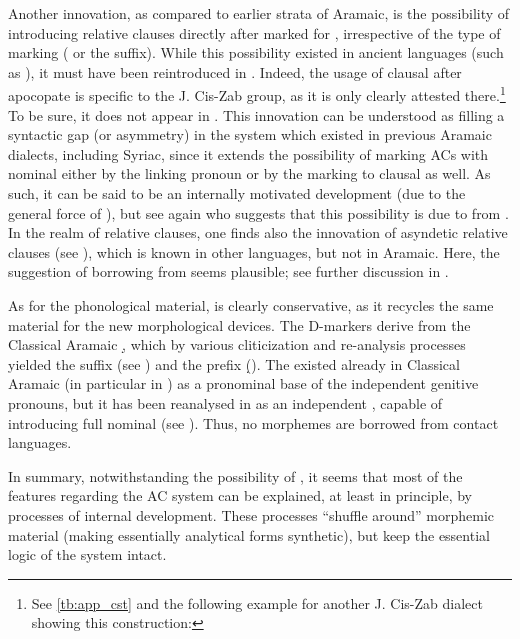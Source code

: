 Another innovation, as compared to earlier strata of Aramaic, is the possibility of introducing relative clauses directly after \prims marked for \cst*, irrespective of the type of marking ( or the \ed suffix). While this possibility existed in ancient  languages (such as \BHeb), it must have been reintroduced in . Indeed, the usage of clausal \secns after apocopate \cst* \prims is specific to the J. Cis-Zab group, as it is only clearly attested there.\footnote{See \vref{tb:app_cst} and the following \Amd example for another J. Cis-Zab dialect showing this construction: 

} To be sure, it does not appear in . This innovation can be understood as filling a syntactic   gap (or asymmetry) in the system which existed in previous Aramaic dialects, including Syriac, since it extends the possibility of marking ACs with nominal \secns either by the linking pronoun or by the \cst* marking to clausal \secns as well. As such, it can be said to be an internally motivated development (due to the general force of ), but see again \citet[123]{CohenEzafe} who suggests that this possibility is due to  from \Kur.
 In the realm of relative clauses, one finds also the innovation of asyndetic relative clauses (see ), which is known in other  languages, but not in Aramaic. Here, the suggestion of borrowing from  \citep[138]{CohenZakho} seems plausible; see further discussion in . 

 
As for the phonological material, \JZax is clearly conservative, as it recycles the same material for the new morphological devices. The D-markers derive from the Classical Aramaic \lnk* \d, which by various cliticization and re-analysis processes  yielded the \cst* suffix \ed (see ) and the \gen* prefix \d (). The \lnk* {} existed already in Classical Aramaic (in particular in \JBA) as a pronominal base of the independent genitive pronouns, but it has been reanalysed in \JZax as an independent \lnk*, capable of introducing full nominal \secns (see ). Thus, no morphemes are borrowed from contact languages.

 \largerpage
In summary, notwithstanding the possibility of , it seems that most of the \JZax features regarding the AC system can be explained, at least in principle, by processes of internal development. These processes \enquote{shuffle around} morphemic material (making essentially analytical forms synthetic), but keep the essential logic of the system intact. 


